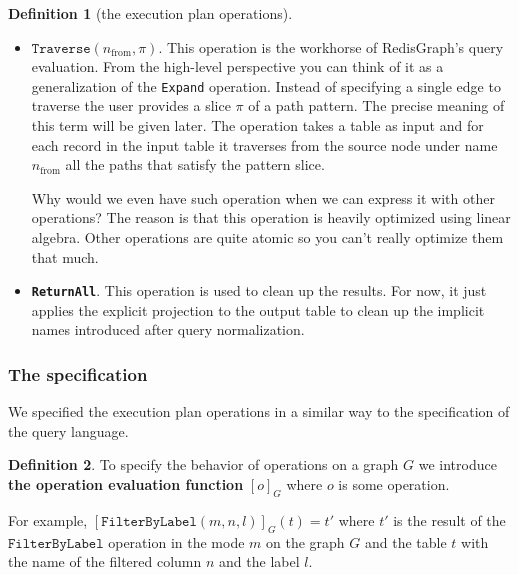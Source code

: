 \documentclass[14pt]{constructor-thesis}
\theoremstyle{definition}
\newtheorem{definition}{Definition}
\begin{document}
\begin{definition}[the execution plan operations]
\begin{itemize}
    If we know the exact mode we can write it as:
    \begin{itemize}
      \item $[\texttt{ExpandAll}(n_{\mathrm{from}}, n_{\mathrm{edge}}, n_{\mathrm{to}}, d)]_G$
      \item $[\texttt{ExpandInto}(n_{\mathrm{from}}, n_{\mathrm{edge}}, n_{\mathrm{to}}, d)]_G$
    \end{itemize}

    \item $\texttt{Traverse}(n_{\mathrm{from}}, \pi)$. This operation is the workhorse of RedisGraph's query evaluation. From the high-level perspective you can think of it as a generalization of the \texttt{Expand} operation. Instead of specifying a single edge to traverse the user provides a slice $\pi$ of a path pattern. The precise meaning of this term will be given later. The operation takes a table as input and for each record in the input table it traverses from the source node under name $n_{\mathrm{from}}$ all the paths that satisfy the pattern slice.
    
    Why would we even have such operation when we can express it with other operations? The reason is that this operation is heavily optimized using linear algebra. Other operations are quite atomic so you can't really optimize them that much.

    \item \textbf{\texttt{ReturnAll}}. This operation is used to clean up the results. For now, it just applies the explicit projection to the output table to clean up the implicit names introduced after query normalization.
    
  \end{itemize}
\end{definition}

\subsubsection*{The specification}

We specified the execution plan operations in a similar way to the specification of the query language.

\begin{definition}
  To specify the behavior of operations on a graph $G$ we introduce \textbf{the operation evaluation function} $[o]_G$ where $o$ is some operation. 
  
  For example, $ [\texttt{FilterByLabel}(m, n, l)]_G (t) = t' $ where $t'$ is the result of the $\texttt{FilterByLabel}$ operation in the mode $m$ on the graph $G$ and the table $t$ with the name of the filtered column $n$ and the label $l$.
\end{definition}
\end{document}
